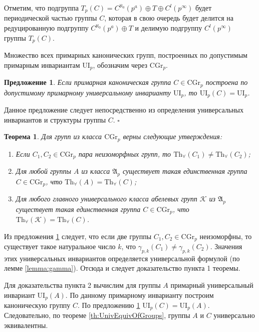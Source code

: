 \documentclass[a4paper,11pt,twoside]{article}
\newtheorem{theorem}{Теорема}[section]
\newtheorem{proposition}{Предложение}[section]
\def\proof{{\noindent{\bf Доказательство.}} }
\def\A{{\mathfrak{A}}}
\def\K{{\mathcal{K}}}
\def\Tha{{\mathrm{Th}_\forall}}
\def\CG{{\mathrm{CGr}}}
\def\ui{{\mathrm{UI}}}
\begin{document}
Отметим, что подгруппа $T_p(C) = C^{\aleph_0}(p^a) \oplus T \oplus C^l(p^\infty)$ будет периодической частью группы $C$, которая в свою очередь будет делится на редуцированную подгруппу $C^{\aleph_0}(p^a) \oplus T$ и делимую подгруппу $C^l(p^\infty)$ группы $T_p(C)$.

Множество всех примарных канонических групп, построенных по допустимым примарным инвариантам $\ui_p$, обозначим через $\CG_p$.

\begin{proposition}\label{prop:UnivEnvForCannonicalGroup}
Если примарная каноническая группа $C \in \CG_p$ построена по допустимому примарному универсальному инварианту $\ui_p$, то $\ui_p(C) = \ui_p$.
\end{proposition}
\proof Данное предложение следует непосредственно из определения универсальных инвариантов и структуры группы $C$. $\square$

\begin{theorem}\label{th:CannonicalGroupsP}
Для групп из класса $\CG_p$ верны следующие утверждения:
\begin{enumerate}
\item Если $C_1, C_2 \in \CG_p$ пара неизоморфных групп, то $\Tha(C_1) \neq \Tha(C_2)$;
\item Для любой группы $A$ из класса $\A_p$ существует такая единственная группа $C \in \CG_p$, что $\Tha(A) = \Tha(C)$;
\item Для любого главного универсального класса абелевых групп $\K$ из $\A_p$ существует такая единственная группа $C \in \CG_p$, что $\Tha(\K) = \Tha(C)$.
\end{enumerate}
\end{theorem}
\proof Из предложения \ref{prop:UnivEnvForCannonicalGroup} следует, что если две группы $C_1, C_2 \in \CG_p$ неизоморфны, то существует такое натуральное число $k$, что $\gamma_{p,k}(C_1) \neq \gamma_{p,k}(C_2)$. Значения этих универсальных инвариантов определяется универсальной формулой (по лемме \ref{lemma:gamma}). Отсюда и следует доказательство пункта 1 теоремы.

Для доказательства пункта 2 вычислим для группы $A$ примарный универсальный инвариант $\ui_p(A)$. По данному примарному инварианту построим каноническую группу $C$. По предложению \ref{prop:UnivEnvForCannonicalGroup} $\ui_p(C) = \ui_p(A)$. Следовательно, по теореме \ref{th:UnivEquivOfGroups}, группы $A$ и $C$ универсально эквивалентны.
\end{document}
